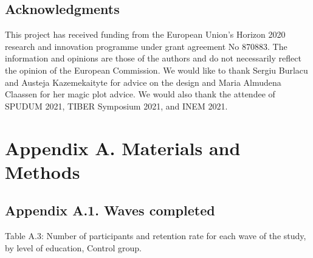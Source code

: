 \documentclass[authordate, empirical]{jote-new-article}
\begin{document}
	\subsection{Acknowledgments}



	This project has received funding from the European Union's Horizon 2020 research and innovation programme under grant agreement No 870883. The information and opinions are those of the authors and do not necessarily reflect the opinion of the European Commission. We would like to thank Sergiu Burlacu and Austeja Kazemekaityte for advice on the design and Maria Almudena Claassen for her magic plot advice. We would also thank the attendee of SPUDUM 2021, TIBER Symposium 2021, and INEM 2021.







	\section{Appendix A. Materials and Methods}



	\subsection{Appendix A.1. Waves completed}



	Table A.3: Number of participants and retention rate for each wave of the study, by level of education, Control group.
\end{document}
